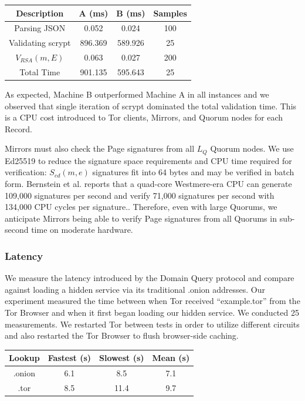 \documentclass{sig-alternate}
\begin{document}
\renewcommand{\arraystretch}{1}
\begin{center}
    \begin{tabular}{ | c | c | c | c |}
    \hline
    \textbf{Description} & \textbf{A (ms)} & \textbf{B (ms)} & \textbf{Samples} \\ \hline
    Parsing JSON & 0.052 & 0.024 & 100 \\ \hline
	Validating scrypt & 896.369 & 589.926 & 25 \\ \hline
	$ V_{\mathit{RSA}}(m, E) $ & 0.063 & 0.027 & 200 \\ \hline
	Total Time & 901.135 & 595.643 & 25 \\ \hline
    \end{tabular}
\end{center}

As expected, Machine B outperformed Machine A in all instances and we observed that single iteration of scrypt dominated the total validation time. This is a CPU cost introduced to Tor clients, Mirrors, and Quorum nodes for each Record.

Mirrors must also check the Page signatures from all $ L_{Q} $ Quorum nodes. We use Ed25519 to reduce the signature space requirements and CPU time required for verification: $ S_{\mathit{ed}}(m, e) $ signatures fit into 64 bytes and may be verified in batch form. Bernstein et al. reports that a quad-core Westmere-era CPU can generate 109,000 signatures per second and verify 71,000 signatures per second with 134,000 CPU cycles per signature.\cite{bernstein2011high}. Therefore, even with large Quorums, we anticipate Mirrors being able to verify Page signatures from all Quorums in sub-second time on moderate hardware.

\subsubsection{Latency}

We measure the latency introduced by the Domain Query protocol and compare against loading a hidden service via its traditional .onion addresses. Our experiment measured the time between when Tor received ``example.tor'' from the Tor Browser and when it first began loading our hidden service. We conducted 25 measurements. We restarted Tor between tests in order to utilize different circuits and also restarted the Tor Browser to flush browser-side caching.

\renewcommand{\arraystretch}{1}
\begin{center}
    \begin{tabular}{ | c | c | c | c |}
    \hline
    \textbf{Lookup} & \textbf{Fastest (s)} & \textbf{Slowest (s)} & \textbf{Mean (s)} \\
    \hline
    .onion & 6.1 & 8.5 & 7.1 \\ \hline
	.tor & 8.5 & 11.4 & 9.7 \\
	\hline
    \end{tabular}
\end{center}
\end{document}
